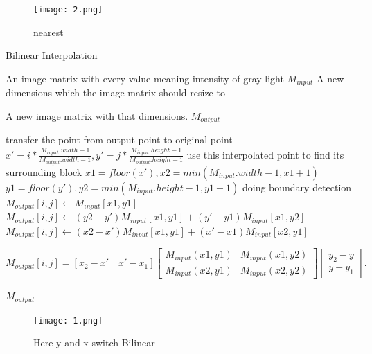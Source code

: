 \documentclass{article}
\begin{document}
\begin{figure}[h]
    \centering
    \texttt{[image: 2.png]}
    \caption{nearest}
    \label{fig:enter-label}
\end{figure}

\begin{algorithm}[h]
  \caption{Bilinear Interpolation}
  \begin{algorithmic}[1]
  \Require
      An image matrix with every value meaning intensity of gray light $M_{input}$
      A new dimensions which the image matrix should resize to 
      
    \Ensure
      A new image matrix with that dimensions. $M_{output}$

      \State transfer the point from output point to original point $x'=i*\frac{M_{input}.width-1}{M_{output}.width-1},y'=j*\frac{M_{input}.height-1}{M_{output}.height-1}$ 
      \State use this interpolated point to find its surrounding block 
      \State $x1=floor(x'),x2=min(M_{input}.width-1,x1+1)$
      \State $y1=floor(y'),y2=min(M_{input}.height-1,y1+1)$
      \State doing boundary detection
      \State $M_{output}[i,j] \gets M_{input}[x1,y1]$
      \State $M_{output}[i,j] \gets (y2-y')M_{input}[x1,y1]+(y'-y1)M_{input}[x1,y2]$
      \State $M_{output}[i,j] \gets (x2-x')M_{input}[x1,y1]+(x'-x1)M_{input}[x2,y1]$
      \Else
      

      \State $M_{output}[i,j]=[x_2-x'\quad x'-x_1]\begin{bmatrix}M_{input}\left(x1,y1\right) & M_{input}(x1,y2)\\ M_{input}(x2,y1) & M_{input}(x2,y2)\end{bmatrix}\begin{bmatrix}y_2-y\\ y-y_1\end{bmatrix}.$
      \EndIf
    \EndFor
   \EndFor
   
   \Return $M_{output}$
    \label{code:recentEnd}
  \end{algorithmic}
\end{algorithm}

\begin{figure}[h]
    \centering
    \texttt{[image: 1.png]}
    \caption{Here y and x switch Bilinear}
    \label{fig:enter-label}
\end{figure}
\end{document}
